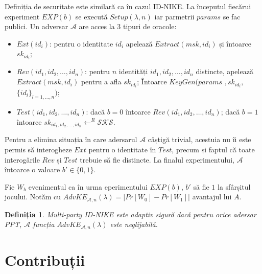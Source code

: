 \documentclass[oneside, 12pt]{book}
\newtheorem{definitie}{\textbf{Definiția}}[section]
\begin{document}
Definiția de securitate este similară ca în cazul ID-NIKE. La începutul fiecărui experiment $EXP(b)$ se execută $Setup(\lambda, n)$ iar parmetrii $params$ se fac publici. Un adversar $\mathcal{A}$ are acces la $3$ tipuri de oracole:
\begin{itemize}
	\item $Ext(id_i)$: pentru o identitate $id_i$ apelează $Extract(msk,id_i)$ și întoarce $sk_{id_i}$;
	\item $Rev(id_1, id_2, \dots, id_n)$: pentru $n$ identități $id_1, id_2, \dots, id_n$ distincte, apelează $Extract(msk, id_i)$ pentru a afla $sk_{id_i}$; Întoarce $KeyGen(params$ $,sk_{id_i},$ $\{id_l\}_{l=1,\dots,n})$;
	\item $Test(id_1, id_2, \dots, id_n)$: dacă $b = 0$ întoarce $Rev(id_1, id_2, \dots, id_n)$; dacă $b = 1$ întoarce $sk_{id_1, id_2, \dots, id_n} \leftarrow^R \mathcal{SKS}$.
\end{itemize}

Pentru a elimina situația în care adersarul $\mathcal{A}$ câștigă trivial, acestuia nu îi este permis să interogheze $Ext$ pentru o identitate în $Test$, precum și faptul că toate interogările $Rev$ și $Test$ trebuie să fie distincte. La finalul experimentului, $\mathcal{A}$ întoarce o valoare $b' \in \{0, 1\}$.

Fie $W_b$ evenimentul ca în urma eperimentului $EXP(b)$, $b'$ să fie $1$ la sfârșitul jocului. Notăm cu $AdvKE_{\mathcal{A}, n}(\lambda) = |Pr[W_0] - Pr[W_1]|$ avantajul lui $A$.
\\
\begin{definitie}
	Multi-party ID-NIKE este adaptiv sigură dacă pentru orice adersar PPT, $\mathcal{A}$ funcția $AdvKE_{\mathcal{A},n}(\lambda)$ este neglijabilă.
\end{definitie}

\section{Contribuții}
\label{sec:multi-party-contributions}
\end{document}
